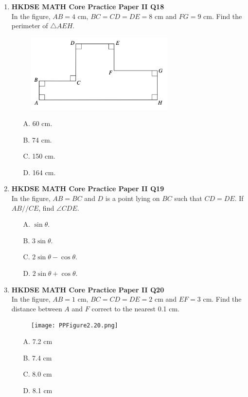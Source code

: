 \documentclass[12pt]{article}
\begin{document}
\begin{enumerate}
	\item \textbf{HKDSE MATH Core Practice Paper II Q18}\\
	In the figure, $AB = 4$ cm, $BC = CD = DE = 8$ cm and $FG = 9$ cm. Find the perimeter of $\triangle AEH$.
	\begin{figure}[H]
		\centering
		\includegraphics[width = 0.7\textwidth]{PPFigure2.18.png}	
	\end{figure}
	\begin{enumerate}
		\item[A.] 60 cm.
		\item[B.] 74 cm.
		\item[C.] 150 cm.
		\item[D.] 164 cm.
	\end{enumerate}

	\item \textbf{HKDSE MATH Core Practice Paper II Q19}\\
	In the figure, $AB = BC$ and $D$ is a point lying on $BC$ such that $CD = DE$. If $AB // CE$, find $\angle CDE$.
	\begin{enumerate}
		\item[A.] $ \sin{\theta}$.
		\item[B.] $3\sin{\theta}$.
		\item[C.] $2\sin{\theta} - \cos{\theta}$.
		\item[D.] $2\sin{\theta} + \cos{\theta}$.
	\end{enumerate}

	\item \textbf{HKDSE MATH Core Practice Paper II Q20}\\
	In the figure, $AB = 1$ cm, $BC = CD = DE = 2$ cm and $EF = 3$ cm. Find the distance between $A$ and $F$ correct to the nearest 0.1 cm.
	\begin{figure}[H]
		\centering
		\texttt{[image: PPFigure2.20.png]}	
	\end{figure}
	\begin{enumerate}
		\item[A.] 7.2 cm
		\item[B.] 7.4 cm
		\item[C.] 8.0 cm
		\item[D.] 8.1 cm
	\end{enumerate}


\end{enumerate}
\end{document}
